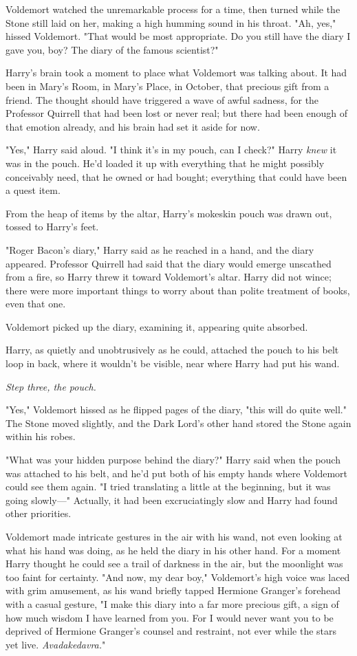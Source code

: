 Voldemort watched the unremarkable process for a time, then turned while the
Stone still laid on her, making a high humming sound in his throat. "Ah, yes,"
hissed Voldemort. "That would be most appropriate. Do you still have the diary
I gave you, boy? The diary of the famous scientist?"

Harry's brain took a moment to place what Voldemort was talking about. It had
been in Mary's Room, in Mary's Place, in October, that precious gift from a
friend. The thought should have triggered a wave of awful sadness, for the
Professor Quirrell that had been lost or never real; but there had been enough
of that emotion already, and his brain had set it aside for now.

"Yes," Harry said aloud. "I think it's in my pouch, can I check?" Harry
\emph{knew} it was in the pouch. He'd loaded it up with everything that he
might possibly conceivably need, that he owned or had bought; everything that
could have been a quest item.

From the heap of items by the altar, Harry's mokeskin pouch was drawn out,
tossed to Harry's feet.

"Roger Bacon's diary," Harry said as he reached in a hand, and the diary
appeared. Professor Quirrell had said that the diary would emerge unscathed
from a fire, so Harry threw it toward Voldemort's altar. Harry did not wince;
there were more important things to worry about than polite treatment of books,
even that one.

Voldemort picked up the diary, examining it, appearing quite absorbed.

Harry, as quietly and unobtrusively as he could, attached the pouch to his belt
loop in back, where it wouldn't be visible, near where Harry had put his wand.

\emph{Step three, the pouch.}

"Yes," Voldemort hissed as he flipped pages of the diary, "this will do quite
well." The Stone moved slightly, and the Dark Lord's other hand stored the
Stone again within his robes.

"What was your hidden purpose behind the diary?" Harry said when the pouch was
attached to his belt, and he'd put both of his empty hands where Voldemort
could see them again. "I tried translating a little at the beginning, but it
was going slowly\mbox{---}" Actually, it had been excruciatingly slow and Harry had
found other priorities.

 Voldemort made intricate gestures in the air with his wand, not even
looking at what his hand was doing, as he held the diary in his other hand. For
a moment Harry thought he could see a trail of darkness in the air, but the
moonlight was too faint for certainty. "And now, my dear boy," Voldemort's high
voice was laced with grim amusement, as his wand briefly tapped Hermione
Granger's forehead with a casual gesture, "I make this diary into a far more
precious gift, a sign of how much wisdom I have learned from you. For I would
never want you to be deprived of Hermione Granger's counsel and restraint, not
ever while the stars yet live. \emph{Avadakedavra.}"

